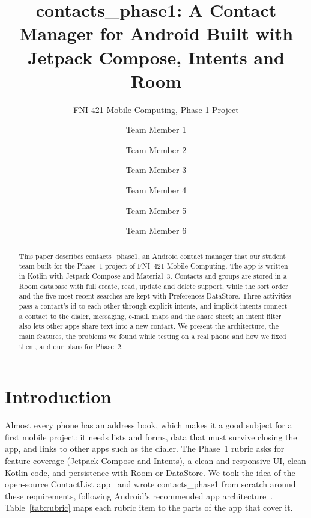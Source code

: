 \documentclass[sigconf,nonacm]{acmart}
\begin{document}
\sloppy

\title{contacts\_phase1: A Contact Manager for Android Built with Jetpack Compose, Intents and Room}
\subtitle{FNI 421 Mobile Computing, Phase 1 Project}

\author{Team Member 1}
\author{Team Member 2}
\author{Team Member 3}
\author{Team Member 4}
\author{Team Member 5}
\author{Team Member 6}

\begin{abstract}
This paper describes contacts\_phase1, an Android contact manager that our student team built for
the Phase~1 project of FNI~421 Mobile Computing. The app is written in Kotlin with
Jetpack Compose and Material~3. Contacts and groups are stored in a Room database with full
create, read, update and delete support, while the sort order and the five most recent searches
are kept with Preferences DataStore. Three activities pass a contact's id to each other through
explicit intents, and implicit intents connect a contact to the dialer, messaging, e-mail, maps
and the share sheet; an intent filter also lets other apps share text into a new contact. We
present the architecture, the main features, the problems we found while testing on a real phone
and how we fixed them, and our plans for Phase~2.
\end{abstract}



\maketitle

\section{Introduction}
Almost every phone has an address book, which makes it a good subject for a first mobile project:
it needs lists and forms, data that must survive closing the app, and links to other apps such as
the dialer. The Phase~1 rubric asks for feature coverage (Jetpack Compose and Intents), a clean
and responsive UI, clean Kotlin code, and persistence with Room or DataStore. We took the idea of
the open-source ContactList app~\cite{contactlist} and wrote contacts\_phase1 from scratch around
these requirements, following Android's recommended app architecture~\cite{architecture}.
Table~\ref{tab:rubric} maps each rubric item to the parts of the app that cover it.
\end{document}
